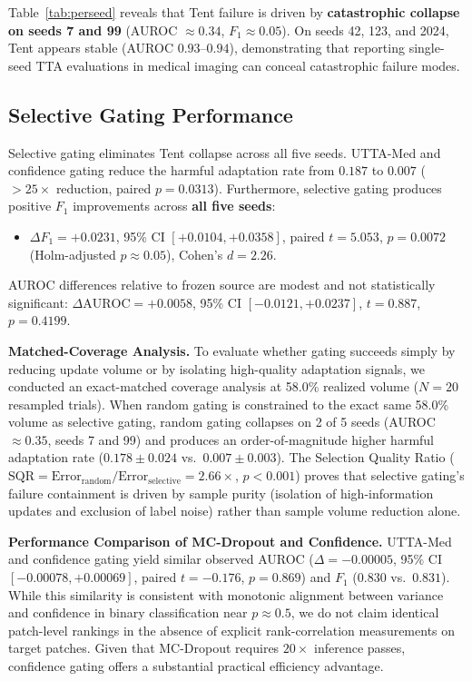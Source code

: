 \documentclass[conference]{IEEEtran}
\begin{document}
Table~\ref{tab:perseed} reveals that Tent failure is driven by \textbf{catastrophic collapse on seeds 7 and 99} (AUROC $\approx 0.34$, $F_1 \approx 0.05$).
On seeds 42, 123, and 2024, Tent appears stable (AUROC $0.93$--$0.94$), demonstrating that reporting single-seed TTA evaluations in medical imaging can conceal catastrophic failure modes.

\subsection{Selective Gating Performance}
Selective gating eliminates Tent collapse across all five seeds.
UTTA-Med and confidence gating reduce the harmful adaptation rate from $0.187$ to $0.007$ ($>25\times$ reduction, paired $p=0.0313$).
Furthermore, selective gating produces positive $F_1$ improvements across \textbf{all five seeds}:
\begin{itemize}
\item $\Delta F_1 = +0.0231$, 95\% CI $[+0.0104, +0.0358]$, paired $t=5.053$, $p=0.0072$ (Holm-adjusted $p \approx 0.05$), Cohen's $d=2.26$.
\end{itemize}
AUROC differences relative to frozen source are modest and not statistically significant: $\Delta \mathrm{AUROC} = +0.0058$, 95\% CI $[-0.0121, +0.0237]$, $t=0.887$, $p=0.4199$.

\textbf{Matched-Coverage Analysis.}
To evaluate whether gating succeeds simply by reducing update volume or by isolating high-quality adaptation signals, we conducted an exact-matched coverage analysis at 58.0\% realized volume ($N=20$ resampled trials).
When random gating is constrained to the exact same 58.0\% volume as selective gating, random gating collapses on 2 of 5 seeds (AUROC $\approx 0.35$, seeds 7 and 99) and produces an order-of-magnitude higher harmful adaptation rate ($0.178 \pm 0.024$ vs.\ $0.007 \pm 0.003$).
The Selection Quality Ratio ($\mathrm{SQR} = \mathrm{Error}_{\mathrm{random}} / \mathrm{Error}_{\mathrm{selective}} = 2.66\times$, $p < 0.001$) proves that selective gating's failure containment is driven by sample purity (isolation of high-information updates and exclusion of label noise) rather than sample volume reduction alone.

\textbf{Performance Comparison of MC-Dropout and Confidence.}
UTTA-Med and confidence gating yield similar observed AUROC ($\Delta = -0.00005$, 95\% CI $[-0.00078, +0.00069]$, paired $t=-0.176$, $p=0.869$) and $F_1$ ($0.830$ vs.\ $0.831$).
While this similarity is consistent with monotonic alignment between variance and confidence in binary classification near $p \approx 0.5$, we do not claim identical patch-level rankings in the absence of explicit rank-correlation measurements on target patches.
Given that MC-Dropout requires $20\times$ inference passes, confidence gating offers a substantial practical efficiency advantage.
\end{document}
